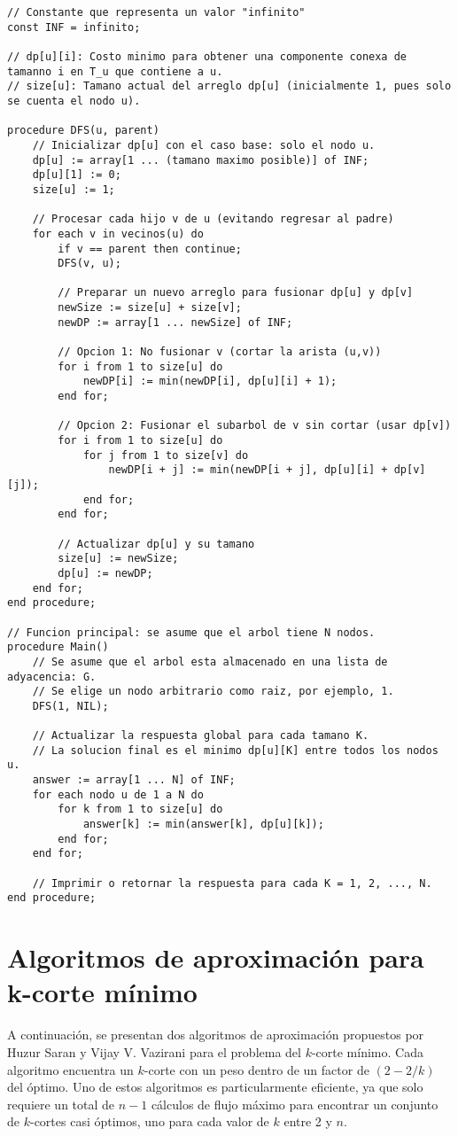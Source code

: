 \documentclass[a4paper, 12pt]{article}
\begin{document}
\begin{lstlisting}[caption={Pseudocódigo en \(O(N^2)\)}]
// Constante que representa un valor "infinito"
const INF = infinito;  

// dp[u][i]: Costo minimo para obtener una componente conexa de tamanno i en T_u que contiene a u.
// size[u]: Tamano actual del arreglo dp[u] (inicialmente 1, pues solo se cuenta el nodo u).

procedure DFS(u, parent)
    // Inicializar dp[u] con el caso base: solo el nodo u.
    dp[u] := array[1 ... (tamano maximo posible)] of INF;
    dp[u][1] := 0;
    size[u] := 1;

    // Procesar cada hijo v de u (evitando regresar al padre)
    for each v in vecinos(u) do
        if v == parent then continue;
        DFS(v, u);

        // Preparar un nuevo arreglo para fusionar dp[u] y dp[v]
        newSize := size[u] + size[v];
        newDP := array[1 ... newSize] of INF;

        // Opcion 1: No fusionar v (cortar la arista (u,v))
        for i from 1 to size[u] do
            newDP[i] := min(newDP[i], dp[u][i] + 1);
        end for;

        // Opcion 2: Fusionar el subarbol de v sin cortar (usar dp[v])
        for i from 1 to size[u] do
            for j from 1 to size[v] do
                newDP[i + j] := min(newDP[i + j], dp[u][i] + dp[v][j]);
            end for;
        end for;

        // Actualizar dp[u] y su tamano
        size[u] := newSize;
        dp[u] := newDP;
    end for;
end procedure;

// Funcion principal: se asume que el arbol tiene N nodos.
procedure Main()
    // Se asume que el arbol esta almacenado en una lista de adyacencia: G.
    // Se elige un nodo arbitrario como raiz, por ejemplo, 1.
    DFS(1, NIL);

    // Actualizar la respuesta global para cada tamano K.
    // La solucion final es el minimo dp[u][K] entre todos los nodos u.
    answer := array[1 ... N] of INF;
    for each nodo u de 1 a N do
        for k from 1 to size[u] do
            answer[k] := min(answer[k], dp[u][k]);
        end for;
    end for;

    // Imprimir o retornar la respuesta para cada K = 1, 2, ..., N.
end procedure;
\end{lstlisting}

\section{Algoritmos de aproximación para k-corte mínimo}
A continuación, se presentan dos algoritmos de aproximación propuestos por Huzur Saran y Vijay V. Vazirani \cite{HV} para el problema del \( k \)-corte mínimo. Cada algoritmo encuentra un \( k \)-corte con un peso dentro de un factor de \( (2 - 2/k) \) del óptimo. Uno de estos algoritmos es particularmente eficiente, ya que solo requiere un total de \( n - 1 \) cálculos de flujo máximo para encontrar un conjunto de \( k \)-cortes casi óptimos, uno para cada valor de \( k \) entre 2 y \( n \).
\end{document}
